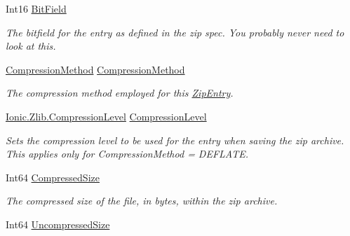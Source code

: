 \begin{DoxyCompactItemize}
Int16 \mbox{\hyperlink{class_super_tiled2_unity_1_1_ionic_1_1_zip_1_1_zip_entry_abe02c41fe4d270aefd0ae1b271d8bef4}{Bit\+Field}}
\begin{DoxyCompactList}\small\item\em The bitfield for the entry as defined in the zip spec. You probably never need to look at this. \end{DoxyCompactList}\item 
\mbox{\hyperlink{namespace_super_tiled2_unity_1_1_ionic_1_1_zip_a48fd7a4529dd87fb2fda54f62ae3d8a3}{Compression\+Method}} \mbox{\hyperlink{class_super_tiled2_unity_1_1_ionic_1_1_zip_1_1_zip_entry_a8d566d136931133f42c0d6ef62c32f2c}{Compression\+Method}}
\begin{DoxyCompactList}\small\item\em The compression method employed for this \mbox{\hyperlink{class_super_tiled2_unity_1_1_ionic_1_1_zip_1_1_zip_entry}{Zip\+Entry}}. \end{DoxyCompactList}\item 
\mbox{\hyperlink{namespace_super_tiled2_unity_1_1_ionic_1_1_zlib_a20f6771804996c363f454ad9765cd7db}{Ionic.\+Zlib.\+Compression\+Level}} \mbox{\hyperlink{class_super_tiled2_unity_1_1_ionic_1_1_zip_1_1_zip_entry_a33bd0a9dc3440f2ee25bdf798c17d33d}{Compression\+Level}}
\begin{DoxyCompactList}\small\item\em Sets the compression level to be used for the entry when saving the zip archive. This applies only for Compression\+Method = D\+E\+F\+L\+A\+TE. \end{DoxyCompactList}\item 
Int64 \mbox{\hyperlink{class_super_tiled2_unity_1_1_ionic_1_1_zip_1_1_zip_entry_a45604152b5da4f8c24ee1e89abb1c396}{Compressed\+Size}}
\begin{DoxyCompactList}\small\item\em The compressed size of the file, in bytes, within the zip archive. \end{DoxyCompactList}\item 
Int64 \mbox{\hyperlink{class_super_tiled2_unity_1_1_ionic_1_1_zip_1_1_zip_entry_ad41c71d426caa6377c1af3682bd2055c}{Uncompressed\+Size}}

\end{DoxyCompactItemize}
